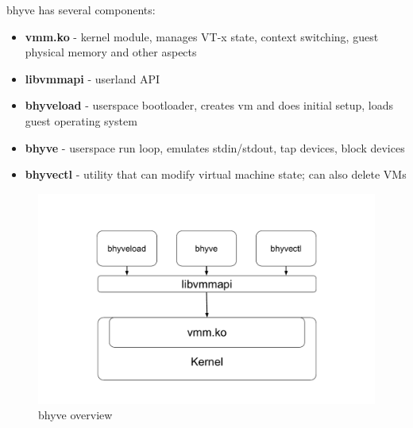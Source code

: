 bhyve has several components\cite{intr-bhyve}\cite{extending-bhyve}:
\begin{itemize}
\item
\textbf{vmm.ko} - kernel module, manages VT-x state, context switching, guest physical memory and other aspects
\item
\textbf{libvmmapi} - userland API
\item
\textbf{bhyveload} - userspace bootloader, creates vm and does initial setup, loads guest operating system
\item
\textbf{bhyve} - userspace run loop, emulates stdin/stdout, tap devices, block devices
\item
\textbf{bhyvectl} - utility that can modify virtual machine state; can also delete VMs
\end{itemize}

\begin{figure}[ht]
\centering
  \includegraphics[width=.75\linewidth]{img/bhyve.pdf}
  \caption{bhyve overview}
\end{figure}
